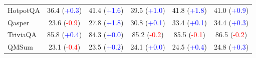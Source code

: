 \begin{table}[h]
\begin{tabular*}{\columnwidth}{@{\extracolsep{\fill}}l|ccccc}
HotpotQA & 36.4 (\textcolor{blue}{+0.3}) & 41.4 (\textcolor{blue}{+1.6}) & 39.5 (\textcolor{blue}{+1.0}) & 41.8 (\textcolor{blue}{+1.8}) & 41.0 (\textcolor{blue}{+0.9}) \\
Qasper & 23.6 (\textcolor{red}{-0.9}) & 27.8 (\textcolor{blue}{+1.8}) & 30.8 (\textcolor{blue}{+0.1}) & 33.4 (\textcolor{blue}{+0.1}) & 34.4 (\textcolor{blue}{+0.3}) \\
TriviaQA & 85.8 (\textcolor{blue}{+0.4}) & 84.3 (\textcolor{blue}{+0.0}) & 85.2 (\textcolor{red}{-0.2}) & 85.5 (\textcolor{red}{-0.1}) & 86.5 (\textcolor{red}{-0.2}) \\
QMSum & 23.1 (\textcolor{red}{-0.4}) & 23.5 (\textcolor{blue}{+0.2}) & 24.1 (\textcolor{blue}{+0.0}) & 24.5 (\textcolor{blue}{+0.4}) & 24.8 (\textcolor{blue}{+0.3}) \\
\bottomrule
\end{tabular*}
\end{table}
